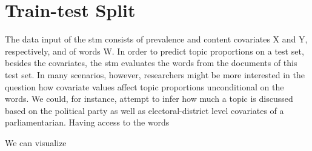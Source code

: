 \section{Train-test Split}

The data input of the stm consists of prevalence and content covariates X and Y, respectively, and of words W. In order to predict topic proportions on a test set, besides the covariates, the stm evaluates the words from the documents of this test set. In many scenarios, however, researchers might be more interested in the question how covariate values affect topic proportions unconditional on the words. We could, for instance, attempt to infer how much a topic is discussed based on the political party as well as electoral-district level covariates of a parliamentarian. Having access to the words 

We can visualize 